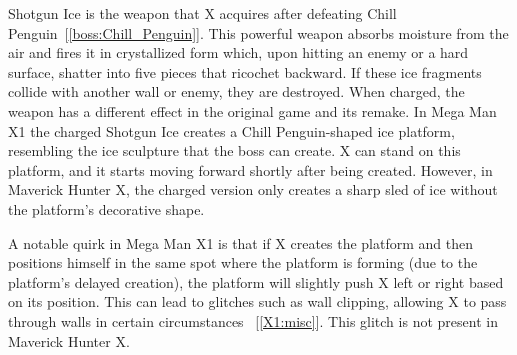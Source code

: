 Shotgun Ice is the weapon that X acquires after defeating Chill Penguin~[\ref{boss:Chill_Penguin}]. This powerful weapon absorbs moisture from the air and fires it in crystallized form which, upon hitting an enemy or a hard surface, shatter into five pieces that ricochet backward. If these ice fragments collide with another wall or enemy, they are destroyed. When charged, the weapon has a different effect in the original game and its remake. In Mega Man X1 the charged Shotgun Ice creates a Chill Penguin-shaped ice platform, resembling the ice sculpture that the boss can create. X can stand on this platform, and it starts moving forward shortly after being created. However, in Maverick Hunter X, the charged version only creates a sharp sled of ice without the platform's decorative shape.

A notable quirk in Mega Man X1 is that if X creates the platform and then positions himself in the same spot where the platform is forming (due to the platform's delayed creation), the platform will slightly push X left or right based on its position. This can lead to glitches such as wall clipping, allowing X to pass through walls in certain circumstances ~[\ref{X1:misc}]. This glitch is not present in Maverick Hunter X.

